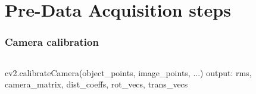 \section{Pre-Data Acquisition steps}
\begin{frame}[fragile]
	\frametitle{Camera calibration}
	\begin{columns}
		\begin{semiverbatim}
			cv2.calibrateCamera(object_points, image_points, ...)
			output: rms, camera_matrix, dist_coeffs, rot_vecs, trans_vecs
		\end{semiverbatim}
		
		
	\end{columns}
\end{frame}



